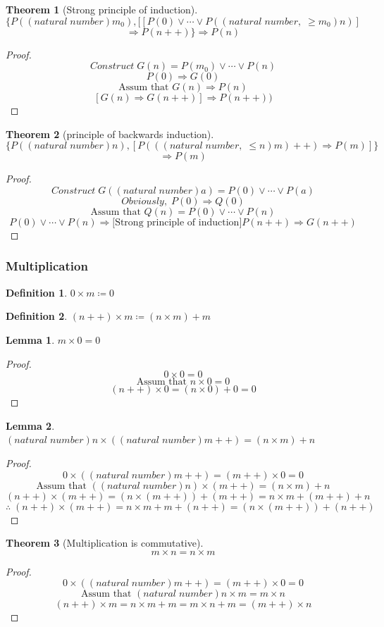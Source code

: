 \documentclass[a4paper]{report}
\theoremstyle{definition}
\newtheorem{definition}{Definition}[subsection]
\newtheorem{lemma}{Lemma}[subsubsection]
\newtheorem{theorem}{Theorem}[subsection]
\newcommand{\nn}{(natural\;number)}
\newcommand{\at}{\text{Assum that }}
\begin{document}
\begin{theorem}[Strong principle of induction]
    $$\{P(\nn m_0),[[P(0)\vee\cdots\vee P((natural\;number,\;\geq m_0)n)]$$
    $$\Rightarrow P(n++)\}\Rightarrow P(n)$$
\end{theorem}
\begin{proof}
    $$Construct\;G(n)=P(m_0)\vee\cdots\vee P(n)$$
    $$P(0)\Rightarrow G(0)$$
    $$\at G(n)\Rightarrow P(n)$$
    $$[G(n)\Rightarrow G(n++)]\Rightarrow P(n++))$$
\end{proof}
\begin{theorem}[principle of backwards induction]
    $$\{P(\nn n),[P(((natural\;number,\;\leq n)m)++)\Rightarrow P(m)]\}$$
    $$\Rightarrow P(m)$$
\end{theorem}
\begin{proof}
    $$Construct\;G(\nn a)=P(0)\vee\cdots\vee P(a)$$
    $$Obviously,\;P(0)\Rightarrow Q(0)$$
    $$\at Q(n)=P(0)\vee\cdots\vee P(n)$$
    $$P(0)\vee\cdots\vee P(n)\Rightarrow\text{[Strong principle of induction]}P(n++)\Rightarrow G(n++)$$
\end{proof}
\subsubsection{Multiplication}
\begin{definition}
    $0\times m\coloneqq0$
\end{definition}
\begin{definition}
    $(n++)\times m\coloneqq(n\times m)+m$
\end{definition}
\begin{lemma}
    $m\times 0=0$
\end{lemma}
\begin{proof}
    $$0\times0=0$$
    $$\at n\times0=0$$
    $$(n++)\times0=(n\times 0)+0=0$$
\end{proof}
\begin{lemma}
    $\nn n\times(\nn m++)=(n\times m)+n$
\end{lemma}
\begin{proof}
    $$0\times(\nn m++)=(m++)\times 0=0$$
    $$\at (\nn n)\times (m++)=(n\times m)+n$$
    $$(n++)\times(m++)=(n\times(m++))+(m++)=n\times m+(m++)+n$$
    $$\therefore\;(n++)\times(m++)=n\times m+m+(n++)=(n\times(m++))+(n++)$$
\end{proof}
\begin{theorem}[Multiplication is commutative]
    $$m\times n=n\times m$$
\end{theorem}
\begin{proof}
    $$0\times (\nn m++)=(m++)\times0=0$$
    $$\at \nn n\times m=m\times n$$
    $$(n++)\times m=n\times m+m=m\times n+m=(m++)\times n$$
\end{proof}
\end{document}
